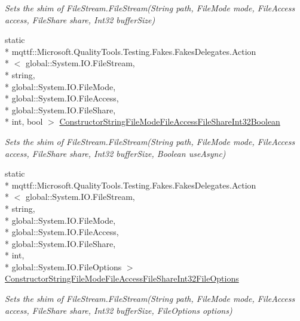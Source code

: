 \begin{DoxyCompactItemize}
\begin{DoxyCompactList}\small\item\em Sets the shim of File\-Stream.\-File\-Stream(\-String path, File\-Mode mode, File\-Access access, File\-Share share, Int32 buffer\-Size)\end{DoxyCompactList}\item 
static \\*
mqttf\-::\-Microsoft.\-Quality\-Tools.\-Testing.\-Fakes.\-Fakes\-Delegates.\-Action\\*
$<$ global\-::\-System.\-I\-O.\-File\-Stream, \\*
string, \\*
global\-::\-System.\-I\-O.\-File\-Mode, \\*
global\-::\-System.\-I\-O.\-File\-Access, \\*
global\-::\-System.\-I\-O.\-File\-Share, \\*
int, bool $>$ \hyperlink{class_system_1_1_i_o_1_1_fakes_1_1_shim_file_stream_ac7a8b3870ff54840d50c96eb6673d7cc}{Constructor\-String\-File\-Mode\-File\-Access\-File\-Share\-Int32\-Boolean}
\begin{DoxyCompactList}\small\item\em Sets the shim of File\-Stream.\-File\-Stream(\-String path, File\-Mode mode, File\-Access access, File\-Share share, Int32 buffer\-Size, Boolean use\-Async)\end{DoxyCompactList}\item 
static \\*
mqttf\-::\-Microsoft.\-Quality\-Tools.\-Testing.\-Fakes.\-Fakes\-Delegates.\-Action\\*
$<$ global\-::\-System.\-I\-O.\-File\-Stream, \\*
string, \\*
global\-::\-System.\-I\-O.\-File\-Mode, \\*
global\-::\-System.\-I\-O.\-File\-Access, \\*
global\-::\-System.\-I\-O.\-File\-Share, \\*
int, \\*
global\-::\-System.\-I\-O.\-File\-Options $>$ \hyperlink{class_system_1_1_i_o_1_1_fakes_1_1_shim_file_stream_a2561e5fb8340c0dc01d227b3c2f57131}{Constructor\-String\-File\-Mode\-File\-Access\-File\-Share\-Int32\-File\-Options}
\begin{DoxyCompactList}\small\item\em Sets the shim of File\-Stream.\-File\-Stream(\-String path, File\-Mode mode, File\-Access access, File\-Share share, Int32 buffer\-Size, File\-Options options)\end{DoxyCompactList}\item 

\end{DoxyCompactItemize}
